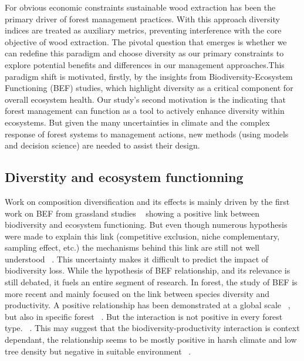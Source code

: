\documentclass{article}
\begin{document}
For obvious economic constraints sustainable wood extraction has been the primary driver of forest management practices. With this approach diversity indices are treated as auxiliary metrics, preventing interference with the core objective of wood extraction. The pivotal question that emerges is whether we can redefine this paradigm and choose diversity as our primary constraints to explore potential benefits and differences in our management approaches.This paradigm shift is motivated, firstly, by the insights from Biodiversity-Ecosystem Functioning (BEF) studies, which highlight diversity as a critical component for overall ecosystem health. Our study's second motivation is the indicating that forest management can function as a tool to actively enhance diversity within ecosystems. But given the many uncertainties in climate and the complex response of forest systems to management actions, new methods (using models and decision science) are needed to assist their design.

\subsection{Diverstity and ecosystem functionning}

Work on composition diversification and its effects is mainly driven by the first work on BEF from grassland studies ~\autocite{tilmanBiodiversityPopulationEcosystem1996} showing a positive link between biodiversity and ecosystem functioning. But even though numerous hypothesis were made to explain this link (competitive exclusion, niche complementary, sampling effect, etc.) the mechanisms behind this link are still not well understood ~\autocite{aliBiodiversityEcosystemFunctioning2023}. This uncertainty makes it difficult to predict the impact of biodiversity loss.
While the hypothesis of BEF relationship, and its relevance is still debated, it fuels an entire segment of research.
In forest, the study of BEF is more recent and mainly focused on the link between species diversity and productivity. A positive relationship has been demonstrated at a global scale ~\autocite{liangPositiveBiodiversityproductivityRelationship2016}, but also in specific forest ~\autocite{morinTreeSpeciesRichness2011,paquetteEffectBiodiversityTree2011,jourdanManagingMixedStands2021}. But the interaction is not positive in every forest type. ~\autocite{forresterReviewProcessesDiversity2016}.
This may suggest that the biodiversity-productivity interaction is context dependant, the relationship seems to be mostly positive in harsh climate and low tree density but negative in suitable environment ~\autocite{juckerClimateModulatesEffects2016}.
\end{document}
